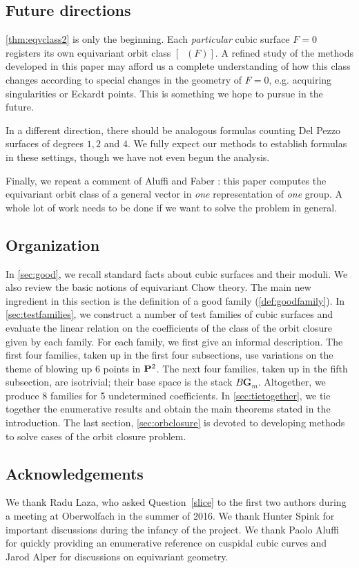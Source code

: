\documentclass[reqno]{amsart}
\DeclareMathOperator{\Orb}{\overline{Orb}}
\renewcommand {\P}{{\bf P}}
\numberwithin{equation}{section}
\newcommand{\G}{\mathbf{G}}
\begin{document}
\subsection{Future directions}

\autoref{thm:eqvclass2} is only the beginning.  Each {\sl particular}
cubic surface $F=0$ registers its own equivariant orbit class
$[\Orb(F)]$.  A refined study of the methods developed in this paper
may afford us a complete understanding of how this class changes
according to special changes in the geometry of $F=0$, e.g. acquiring
singularities or Eckardt points.  This is something we hope to pursue
in the future.

In a different direction, there should be analogous formulas counting
Del Pezzo surfaces of degrees $1,2$ and $4$.  We fully expect our
methods to establish formulas in these settings, though we have not
even begun the analysis.

Finally, we repeat a comment of Aluffi and Faber \cite{alu.fab:93}: this paper computes the equivariant orbit class of a general vector in \emph{one} representation of \emph{one} group.  A whole lot of work needs to be done if we want to solve the problem in general.

\subsection{Organization}
In \autoref{sec:good}, we recall standard facts about cubic surfaces and their moduli.
We also review the basic notions of equivariant Chow theory.
The main new ingredient in this section is the definition of a good family (\autoref{def:goodfamily}).
In \autoref{sec:testfamilies}, we construct a number of test families of cubic surfaces and evaluate the linear relation on the coefficients of the class of the orbit closure given by each family.
For each family, we first give an informal description.
The first four families, taken up in the first four subsections, use variations on the theme of blowing up 6 points in $\P^2$.
The next four families, taken up in the fifth subsection, are isotrivial; their base space is the stack $B\G_m$.
Altogether, we produce 8 families for 5 undetermined coefficients.
In \autoref{sec:tietogether}, we tie together the enumerative results and obtain the main theorems stated in the introduction.
The last section, \autoref{sec:orbclosure} is devoted to developing methods to solve cases of the orbit closure problem.

\subsection{Acknowledgements}
We thank Radu Laza, who asked Question~\ref{slice} to the first two
authors during a meeting at Oberwolfach in the summer of 2016.  We
thank Hunter Spink for important discussions during the infancy
of the project.  We thank Paolo Aluffi for quickly providing an
enumerative reference on cuspidal cubic curves and Jarod Alper for discussions on equivariant geometry.
\end{document}
